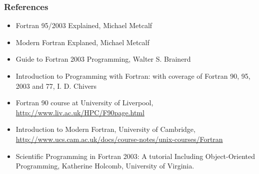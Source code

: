 \documentclass[10pt,t]{beamer}
\begin{document}
\begin{frame}
  \frametitle{\small References}
  \begin{itemize}
    \item Fortran 95/2003 Explained, Michael Metcalf
    \item Modern Fortran Explaned, Michael Metcalf
    \item Guide to Fortran 2003 Programming, Walter S. Brainerd
    \item Introduction to Programming with Fortran: with coverage of Fortran 90, 95, 2003 and 77, I. D. Chivers
    \item Fortran 90 course at University of Liverpool, \url{http://www.liv.ac.uk/HPC/F90page.html}
    \item Introduction to Modern Fortran, University of Cambridge, \url{http://www.ucs.cam.ac.uk/docs/course-notes/unix-courses/Fortran}
    \item Scientific Programming in Fortran 2003: A tutorial Including Object-Oriented Programming, Katherine Holcomb, University of Virginia.
  \end{itemize}
\end{frame}
\end{document}
